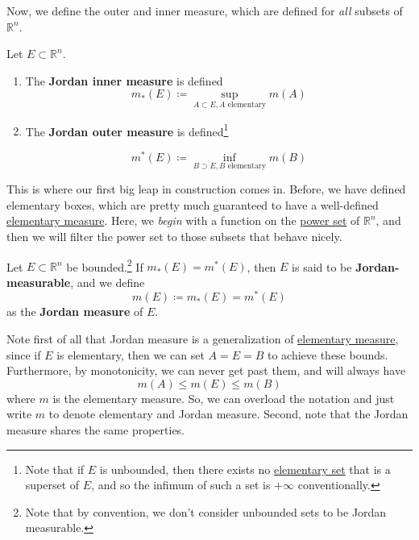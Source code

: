   Now, we define the outer and inner measure, which are defined for \textit{all} subsets of $\mathbb{R}^n$. 

  \begin{definition}
    \label{def:jordan-outer-inner-measure}
    Let $E \subset \mathbb{R}^n$. 
    \begin{enumerate}
      \item The \textbf{Jordan inner measure} is defined 
				\begin{equation}
					m_\ast (E) \coloneqq \sup_{A \subset E, A \text{ elementary}} m(A)
				\end{equation}

			\item The \textbf{Jordan outer measure} is defined\footnote{Note that if $E$ is unbounded, then there exists no \hyperref[def:elementary-set]{elementary set} that is a superset of $E$, and so the infimum of such a set is $+\infty$ conventionally. }

				\begin{equation}
					m^\ast (E) \coloneqq \inf_{B \supset E, B \text{ elementary}} m(B)
				\end{equation}
    \end{enumerate}
  \end{definition}

  This is where our first big leap in construction comes in. Before, we have defined elementary boxes, which are pretty much guaranteed to have a well-defined \hyperref[def:elementary-measure]{elementary measure}. Here, we \textit{begin} with a function on the \hyperref[alg-ex:power-set]{power set} of $\mathbb{R}^n$, and then we will filter the power set to those subsets that behave nicely. 

  \begin{definition}
    \label{def:jordan-measurable-set-jordan-measure}
    Let $E \subset \mathbb{R}^n$ be bounded.\footnote{Note that by convention, we don't consider unbounded sets to be Jordan measurable.} If $m_\ast (E) = m^\ast (E)$, then $E$ is said to be \textbf{Jordan-measurable}, and we define 
    \begin{equation}
      m(E) \coloneqq m_\ast (E) = m^\ast (E)
    \end{equation}
    as the \textbf{Jordan measure} of $E$. 
  \end{definition}

  Note first of all that Jordan measure is a generalization of \hyperref[def:elementary-measure]{elementary measure}, since if $E$ is elementary, then we can set $A = E = B$ to achieve these bounds. Furthermore, by monotonicity, we can never get past them, and will always have 
  \begin{equation}
    m(A) \leq m(E) \leq m(B)
  \end{equation}
  where $m$ is the elementary measure. So, we can overload the notation and just write $m$ to denote elementary and Jordan measure. Second, note that the Jordan measure shares the same properties. 


